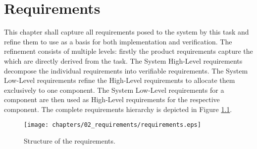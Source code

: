\chapter{Requirements}
This chapter shall capture all requirements posed to the
system by this task and refine them to use as a basis for
both implementation and verification.
The refinement consists of multiple levels:
firstly the product requirements capture the which are directly
derived from the task. The System High-Level requirements
decompose the individual requirements into verifiable
requirements. The System Low-Level requirements refine the 
High-Level requirements to allocate them exclusively to one
component. The System Low-Level requirements for a component
are then used as High-Level requirements for the respective
component. The complete requirements hierarchy is depicted
in Figure \ref{fig:reqStructure}.

\begin{figure}[H]
    \centering
    \texttt{[image: chapters/02\_requirements/requirements.eps]}
    \caption{Structure of the requirements.} 
    \label{fig:reqStructure}
\end{figure}



